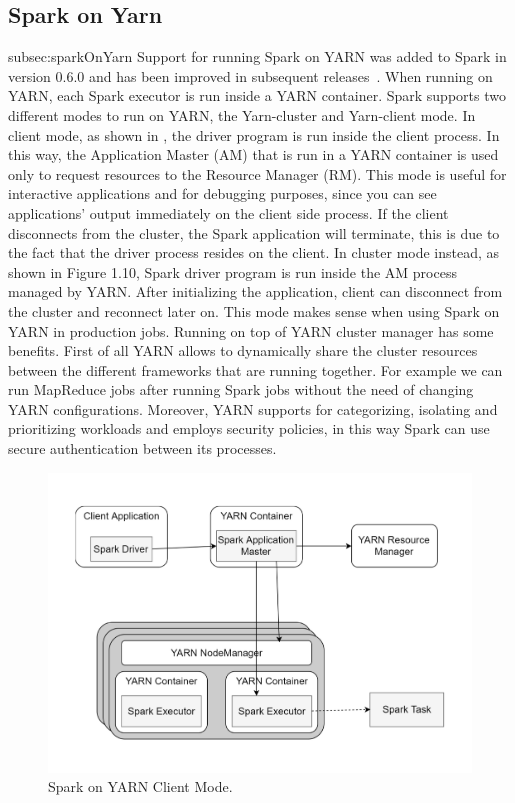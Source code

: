 \subsection{Spark on Yarn}{subsec:sparkOnYarn}
Support for running Spark on YARN was added to Spark in version
0.6.0 and has been improved in subsequent releases~\cite{misc:SparkOnYarn}.
When running on YARN, each Spark executor is run inside a YARN
container. Spark supports two different modes to run on YARN, the
Yarn-cluster and Yarn-client mode.
In client mode, as shown in , the driver program is run
inside the client process. In this way, the Application Master (AM) that
is run in a YARN container is used only to request resources to the Resource
Manager (RM). This mode is useful for interactive applications
and for debugging purposes, since you can see applications’ output
immediately on the client side process. If the client disconnects from
the cluster, the Spark application will terminate, this is due to the fact
that the driver process resides on the client.
In cluster mode instead, as shown in Figure 1.10, Spark driver program
is run inside the AM process managed by YARN. After initializing
the application, client can disconnect from the cluster and reconnect
later on. This mode makes sense when using Spark on YARN in
production jobs.
Running on top of YARN cluster manager has some benefits. First
of all YARN allows to dynamically share the cluster resources between
the different frameworks that are running together. For example
we can run MapReduce jobs after running Spark jobs without the
need of changing YARN configurations. Moreover, YARN supports
for categorizing, isolating and prioritizing workloads and employs
security policies, in this way Spark can use secure authentication between
its processes.
\begin{figure}
	\centering
	\includegraphics[width=\columnwidth]{Images/spark_yarn_client_mode.pdf}  
	\caption[Spark on YARN Client Mode]{Spark on YARN Client Mode.}
	\label{fig:sparkOnYarnClientMode}
\end{figure}
